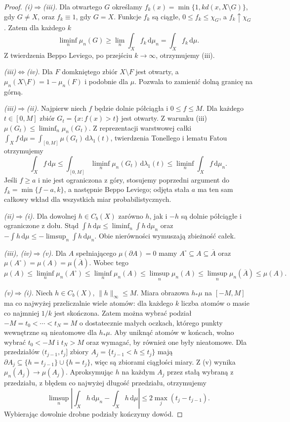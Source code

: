 \documentclass[11pt,a4paper,oneside]{book}
\numberwithin{equation}{chapter}
\theoremstyle{plain}
\theoremstyle{definition}
\theoremstyle{remark}
\begin{document}
\begin{proof}
\emph{(i)$\Rightarrow$(iii).}
Dla otwartego $G$ określamy
$f_k(x)=\min\{1,kd(x,X\setminus G)\}$, gdy
$G\neq X$, oraz $f_k\equiv1$, gdy $G=X$.
Funkcje $f_k$ są ciągłe, $0\le f_k\le\chi_G$,
a $f_k\uparrow\chi_G$. Zatem dla każdego $k$
\[
\liminf_n\mu_n(G)\ge\lim_n\int_X f_k\,\mathrm d\mu_n
=\int_X f_k\,\mathrm d\mu.
\]
Z twierdzenia Beppo Leviego, po przejściu $k\to\infty$,
otrzymujemy (iii).

\emph{(iii)$\Leftrightarrow$(iv).}
Dla $F$ domkniętego zbiór $X\setminus F$ jest otwarty,
a $\mu_n(X\setminus F)=1-\mu_n(F)$ i podobnie
dla $\mu$. Pozwala to zamienić dolną granicę na górną.

\emph{(iii)$\Rightarrow$(ii).}
Najpierw niech $f$ będzie dolnie półciągła i
$0\le f\le M$. Dla każdego $t\in[0,M]$ zbiór
$G_t=\{x:f(x)>t\}$ jest otwarty. Z warunku (iii)
$\mu(G_t)\le\liminf_n\mu_n(G_t)$.
Z reprezentacji warstwowej całki
$\int_X f\,\mathrm d\mu=\int_{[0,M]}\mu(G_t)
\,\mathrm d\lambda_1(t)$, twierdzenia Tonellego
i lematu Fatou otrzymujemy
\[
\int_X f\,\mathrm d\mu
\le\int_{[0,M]}\liminf_n\mu_n(G_t)\,\mathrm d\lambda_1(t)
\le\liminf_n\int_Xf\,\mathrm d\mu_n.
\]
Jeśli $f\ge a$ i nie jest ograniczona z góry,
stosujemy poprzedni argument do
$f_k=\min\{f-a,k\}$, a następnie Beppo Leviego;
odjęta stała $a$ ma ten sam całkowy wkład dla
wszystkich miar probabilistycznych.

\emph{(ii)$\Rightarrow$(i).}
Dla dowolnej $h\in C_b(X)$ zarówno $h$, jak i $-h$
są dolnie półciągłe i ograniczone z dołu. Stąd
$\int h\,\mathrm d\mu\le\liminf_n\int h\,\mathrm d\mu_n$
oraz $-\int h\,\mathrm d\mu\le
-\limsup_n\int h\,\mathrm d\mu_n$.
Obie nierówności wymuszają zbieżność całek.

\emph{(iii), (iv)$\Rightarrow$(v).}
Dla $A$ spełniającego $\mu(\partial A)=0$ mamy
$A^\circ\subseteq A\subseteq\overline A$ oraz
$\mu(A^\circ)=\mu(A)=\mu(\overline A)$.
Wobec tego
\[
\mu(A)\le\liminf_n\mu_n(A^\circ)
\le\liminf_n\mu_n(A)
\le\limsup_n\mu_n(A)
\le\limsup_n\mu_n(\overline A)\le\mu(A).
\]

\emph{(v)$\Rightarrow$(i).}
Niech $h\in C_b(X)$, $\|h\|_\infty\le M$.
Miara obrazowa $h_*\mu$ na $[-M,M]$ ma co najwyżej
przeliczalnie wiele atomów: dla każdego $k$ liczba
atomów o masie co najmniej $1/k$ jest skończona.
Zatem można wybrać podział
$-M=t_0<\cdots<t_N=M$ o dostatecznie małych oczkach,
którego punkty wewnętrzne są nieatomowe dla $h_*\mu$.
Aby uniknąć atomów w końcach, wolno wybrać
$t_0<-M$ i $t_N>M$ oraz wymagać, by również one
były nieatomowe. Dla przedziałów $(t_{j-1},t_j]$
zbiory $A_j=\{t_{j-1}<h\le t_j\}$ mają
$\partial A_j\subseteq\{h=t_{j-1}\}\cup\{h=t_j\}$,
więc są zbiorami ciągłości miary. Z (v) wynika
$\mu_n(A_j)\to\mu(A_j)$. Aproksymując $h$
na każdym $A_j$ przez stałą wybraną z przedziału,
z błędem co najwyżej długość przedziału, otrzymujemy
\[
 \limsup_n\left|\int_Xh\,\mathrm d\mu_n-
 \int_Xh\,\mathrm d\mu\right|
 \le2\max_j(t_j-t_{j-1}).
\]
Wybierając dowolnie drobne podziały kończymy dowód.
\end{proof}
\end{document}
